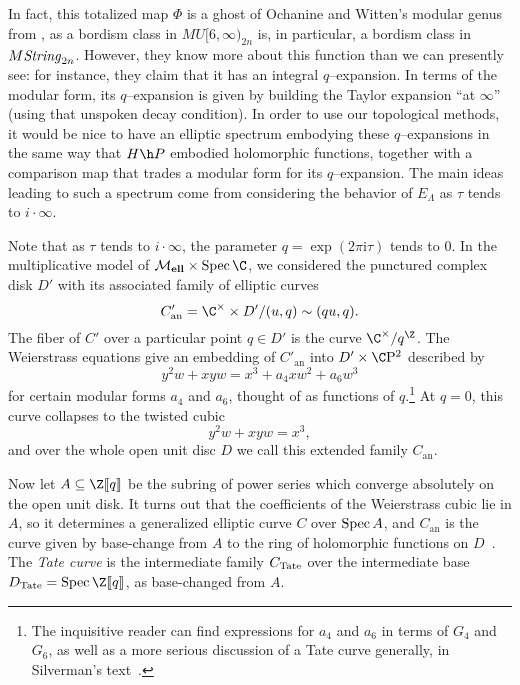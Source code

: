 In fact, this totalized map \(\Phi\) is a ghost of Ochanine and Witten's modular genus from , as a bordism class in \(MU[6, \infty)_{2n}\) is, in particular, a bordism class in \(M\mathit{String}_{2n}\).  However, they know more about this function than we can presently see: for instance, they claim that it has an integral \(q\)--expansion.  In terms of the modular form, its \(q\)--expansion is given by building the Taylor expansion ``at \(\infty\)'' (using that unspoken decay condition).  In order to use our topological methods, it would be nice to have an elliptic spectrum embodying these \(q\)--expansions in the same way that \(H\h P\) embodied holomorphic functions, together with a comparison map that trades a modular form for its \(q\)--expansion.  The main ideas leading to such a spectrum come from considering the behavior of \(E_\Lambda\) as \(\tau\) tends to \(i \cdot \infty\).

\begin{definition}
Note that as \(\tau\) tends to \(i \cdot \infty\), the parameter \(q = \exp(2 \pi \mathrm i \tau)\) tends to \(0\).  In the multiplicative model of \(\moduli{ell} \times \Spec \C\), we considered the punctured complex disk \(D'\) with its associated family of elliptic curves \[C'_{\mathrm{an}} = \C^\times \times D' / (u, q) \sim (qu, q).\]  The fiber of \(C'\) over a particular point \(q \in D'\) is the curve \(\C^\times / q^{\Z}\). %
The Weierstrass equations give an embedding of \(C'_{\mathrm{an}}\) into \(D' \times \CP^2\) described by \[y^2 w + x y w = x^3 + a_4 x w^2 + a_6 w^3\] for certain modular forms \(a_4\) and \(a_6\), thought of as functions of \(q\).\footnote{The inquisitive reader can find expressions for \(a_4\) and \(a_6\) in terms of \(G_4\) and \(G_6\), as well as a more serious discussion of a Tate curve generally, in Silverman's text~\cite[Section VI.1]{SilvermanAdvanced}.}  At \(q = 0\), this curve collapses to the twisted cubic \[y^2 w + x y w = x^3,\] and over the whole open unit disc \(D\) we call this extended family \(C_{\mathrm{an}}\).

Now let \(A \subseteq \Z\ps{q}\) be the subring of power series which converge absolutely on the open unit disk.  It turns out that the coefficients of the Weierstrass cubic lie in \(A\), so it determines a generalized elliptic curve \(C\) over \(\operatorname{Spec} A\), and \(C_{\mathrm{an}}\) is the curve given by base-change from \(A\) to the ring of holomorphic functions on \(D\)~\cite[Section 5]{MoravaFormsOfKthy}.  The \textit{Tate curve} is the intermediate family \(C_{\mathrm{Tate}}\) over the intermediate base \(D_{\Tate} = \Spec \Z\ps{q}\), as base-changed from \(A\).
\end{definition}

